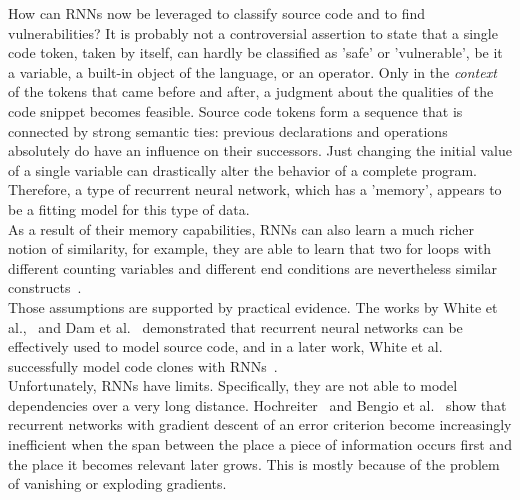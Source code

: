 \documentclass[
a4paper,
pagesize,
pdftex,
12pt,
twoside, %
BCOR=5mm, %
ngerman,
fleqn,
final,
]{scrartcl}
\begin{document}
	How can RNNs now be leveraged to classify source code and to find vulnerabilities? It is probably not a controversial assertion to state that a single code token, taken by itself, can hardly be classified as 'safe' or 'vulnerable', be it a variable, a built-in object of the language, or an operator. Only in the \textit{context} of the tokens that came before and after, a judgment about the qualities of the code snippet becomes feasible. Source code tokens form a sequence that is connected by strong semantic ties: previous declarations and operations absolutely do have an influence on their successors. Just changing the initial value of a single variable can drastically alter the behavior of a complete program. Therefore, a type of recurrent neural network, which has a 'memory', appears to be a fitting model for this type of data.\\
	As a result of their memory capabilities, RNNs can also learn a much richer notion of similarity, for example, they are able to learn that two for loops with different counting variables and different end conditions are nevertheless similar constructs~\cite{Allamanis.2018}. \\
	Those assumptions are supported by practical evidence. The works by White et al.,~\cite{White.2015} and Dam et al.~\cite{Dam.2016b,Dam.2016} demonstrated that recurrent neural networks can be effectively used to model source code, and in a later work, White et al. successfully model code clones with RNNs~\cite{White.2016}.\\
	Unfortunately, RNNs have limits. Specifically, they are not able to model dependencies over a very long distance. Hochreiter~\cite{Hochreiter.1991} and Bengio et al.~\cite{Bengio.1994} show that recurrent networks with gradient descent of an error criterion become increasingly inefficient when the span between the place a piece of information occurs first and the place it becomes relevant later grows. This is mostly because of the problem of vanishing or exploding gradients.\\
	
\end{document}
